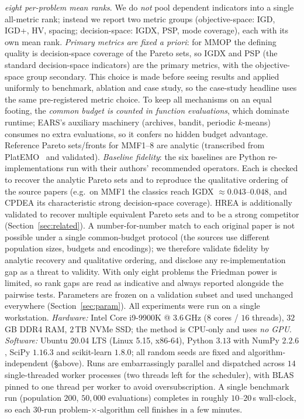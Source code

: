 \emph{eight per-problem mean ranks}. We do \emph{not} pool dependent indicators into a single
all-metric rank; instead we report two metric groups (objective-space: IGD, IGD+, HV, spacing;
decision-space: IGDX, PSP, mode coverage), each with its own mean rank. \emph{Primary metrics
are fixed a priori}: for MMOP the defining quality is decision-space coverage of the Pareto
sets, so IGDX and PSP (the standard decision-space indicators) are the primary metrics, with
the objective-space group secondary. This choice is made before seeing results and
applied uniformly to benchmark, ablation and case study, so the case-study headline uses the same
pre-registered metric choice. To keep all mechanisms on an equal footing,
the \emph{common budget is counted in function evaluations}, which dominate runtime; EARS's
auxiliary machinery (archives, bandit, periodic $k$-means) consumes no extra evaluations, so it
confers no hidden budget advantage. Reference Pareto sets/fronts for MMF1--8 are analytic
(transcribed from PlatEMO~\parencite{tian2017platemo} and validated). \emph{Baseline fidelity}: the
six baselines are Python re-implementations run with their authors' recommended operators.
Each is checked to recover the analytic Pareto sets and to reproduce the qualitative ordering
of the source papers (e.g.\ on MMF1 the classics reach IGDX $\approx 0.043$--$0.048$, and
CPDEA its characteristic strong decision-space coverage). HREA is additionally validated to
recover multiple equivalent Pareto sets and to be a strong competitor
(Section~\ref{sec:related}). A number-for-number match to each original paper is not possible
under a single common-budget protocol (the sources use different population sizes, budgets and
encodings); we therefore validate fidelity by analytic recovery and qualitative ordering, and
disclose any re-implementation gap as a threat to validity. With only
eight problems the Friedman power is limited, so rank gaps are read as indicative and always
reported alongside the pairwise tests. Parameters are frozen on a validation subset and used
unchanged everywhere (Section~\ref{sec:param}). All experiments were run on a single
workstation. \emph{Hardware:} Intel Core i9-9900K @ 3.6\,GHz ($8$ cores / $16$ threads),
$32$\,GB DDR4 RAM, $2$\,TB NVMe SSD; the method is CPU-only and uses \emph{no GPU}.
\emph{Software:} Ubuntu 20.04 LTS (Linux 5.15, x86-64), Python $3.13$ with NumPy $2.2.6$,
SciPy $1.16.3$ and scikit-learn $1.8.0$; all random seeds are fixed and algorithm-independent
(\S above). Runs are embarrassingly parallel and dispatched across $14$ single-threaded worker
processes (two threads left for the scheduler), with BLAS pinned to one thread per worker to
avoid oversubscription. A single benchmark run (population $200$, $50{,}000$ evaluations)
completes in roughly $10$--$20$\,s wall-clock, so each $30$-run problem-$\times$-algorithm cell
finishes in a few minutes.

